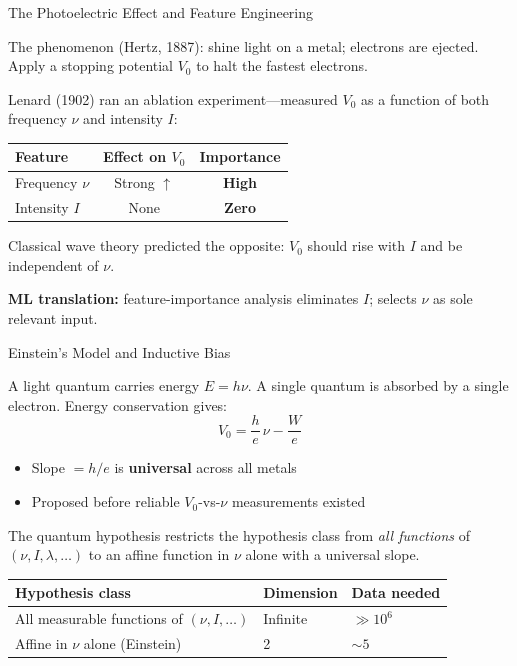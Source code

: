 \documentclass[aspectratio=169]{beamer}
\begin{document}
\begin{frame}{The Photoelectric Effect and Feature Engineering}

The phenomenon (Hertz, 1887): shine light on a metal; electrons are ejected.
Apply a stopping potential $V_0$ to halt the fastest electrons.

\medskip
Lenard (1902) ran an ablation experiment---measured $V_0$ as a function of
both frequency $\nu$ and intensity $I$:

\medskip
\begin{center}
\begin{tabular}{lcc}
\toprule
Feature & Effect on $V_0$ & Importance \\
\midrule
Frequency $\nu$ & Strong $\uparrow$ & \textbf{High} \\
Intensity $I$  & None             & \textbf{Zero} \\
\bottomrule
\end{tabular}
\end{center}

\medskip
Classical wave theory predicted the opposite: $V_0$ should rise with $I$
and be independent of $\nu$.

\medskip
\textbf{ML translation:} feature-importance analysis eliminates $I$;
selects $\nu$ as sole relevant input.

\end{frame}

\begin{frame}{Einstein's Model and Inductive Bias}

A light quantum carries energy $E = h\nu$.
A single quantum is absorbed by a single electron.
Energy conservation gives:
\[
  \boxed{V_0 = \frac{h}{e}\,\nu - \frac{W}{e}}
\]

\begin{itemize}
  \item Slope $= h/e$ is \textbf{universal} across all metals
  \item Proposed before reliable $V_0$-vs-$\nu$ measurements existed
\end{itemize}

\medskip
The quantum hypothesis restricts the hypothesis class from \emph{all
functions} of $(\nu, I, \lambda, \ldots)$ to an affine function in
$\nu$ alone with a universal slope.

\medskip
\begin{center}
\begin{tabular}{lll}
\toprule
Hypothesis class & Dimension & Data needed \\
\midrule
All measurable functions of $(\nu, I, \ldots)$ & Infinite & $\gg 10^6$ \\
Affine in $\nu$ alone (Einstein) & 2 & $\sim 5$ \\
\bottomrule
\end{tabular}
\end{center}

\end{frame}
\end{document}
